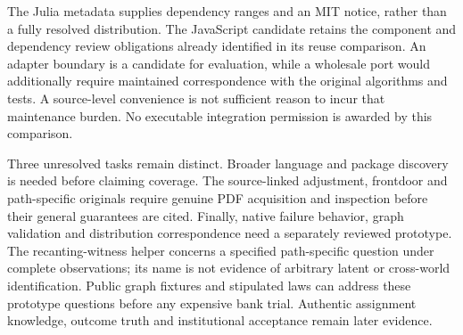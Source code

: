 The Julia metadata supplies dependency ranges and an MIT notice, rather than
a fully resolved distribution. The JavaScript candidate retains the component
and dependency review obligations already identified in its reuse comparison.
An adapter boundary is a candidate for evaluation, while a wholesale port
would additionally require maintained correspondence with the original
algorithms and tests. A source-level convenience is not sufficient reason to
incur that maintenance burden. No executable integration permission is awarded
by this comparison.~\citep{exec19_otherid_julia,exec19_otherid_dagitty}

Three unresolved tasks remain distinct. Broader language and package discovery
is needed before claiming coverage. The source-linked adjustment, frontdoor
and path-specific originals require genuine PDF acquisition and inspection
before their general guarantees are cited. Finally, native failure behavior,
graph validation and distribution correspondence need a separately reviewed
prototype. The recanting-witness helper concerns a specified path-specific
question under complete observations; its name is not evidence of arbitrary
latent or cross-world identification. Public graph fixtures and stipulated
laws can address these prototype questions before any expensive bank trial.
Authentic assignment knowledge, outcome truth and institutional acceptance
remain later evidence.~\citep{exec19_otherid_julia,exec19_otherid_dagitty,exec19_otherid_reference}
